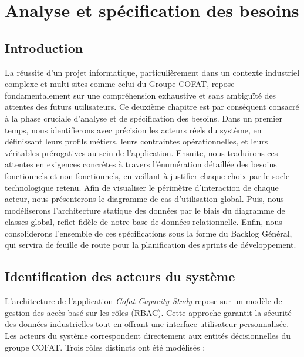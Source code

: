 \chapter{Analyse et spécification des besoins}
\label{chap:analyse_spec}

\section{Introduction}
La réussite d'un projet informatique, particulièrement dans un contexte industriel complexe et multi-sites comme celui du Groupe COFAT, repose fondamentalement sur une compréhension exhaustive et sans ambiguïté des attentes des futurs utilisateurs. Ce deuxième chapitre est par conséquent consacré à la phase cruciale d'analyse et de spécification des besoins. Dans un premier temps, nous identifierons avec précision les acteurs réels du système, en définissant leurs profils métiers, leurs contraintes opérationnelles, et leurs véritables prérogatives au sein de l'application. Ensuite, nous traduirons ces attentes en exigences concrètes à travers l'énumération détaillée des besoins fonctionnels et non fonctionnels, en veillant à justifier chaque choix par le socle technologique retenu. Afin de visualiser le périmètre d'interaction de chaque acteur, nous présenterons le diagramme de cas d'utilisation global. Puis, nous modéliserons l'architecture statique des données par le biais du diagramme de classes global, reflet fidèle de notre base de données relationnelle. Enfin, nous consoliderons l'ensemble de ces spécifications sous la forme du Backlog Général, qui servira de feuille de route pour la planification des sprints de développement.

\section{Identification des acteurs du système}
L'architecture de l'application \textit{Cofat Capacity Study} repose sur un modèle de gestion des accès basé sur les rôles (RBAC). Cette approche garantit la sécurité des données industrielles tout en offrant une interface utilisateur personnalisée. Les acteurs du système correspondent directement aux entités décisionnelles du groupe COFAT. Trois rôles distincts ont été modélisés :

